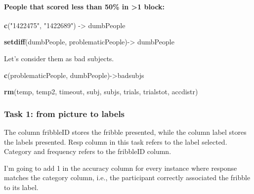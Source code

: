 \documentclass[
]{article}
\newenvironment{Shaded}{\begin{snugshade}}{\end{snugshade}}
\newcommand{\KeywordTok}[1]{\textcolor[rgb]{0.13,0.29,0.53}{\textbf{#1}}}
\newcommand{\NormalTok}[1]{#1}
\newcommand{\StringTok}[1]{\textcolor[rgb]{0.31,0.60,0.02}{#1}}
\begin{document}
\hypertarget{people-that-scored-less-than-50-in-1-block}{%
\paragraph{People that scored less than 50\% in \textgreater1
block:}\label{people-that-scored-less-than-50-in-1-block}}

\begin{Shaded}
\begin{Highlighting}[]
\KeywordTok{c}\NormalTok{(}\StringTok{"1422475"}\NormalTok{, }\StringTok{"1422689"}\NormalTok{) ->}\StringTok{ }\NormalTok{dumbPeople}
\end{Highlighting}
\end{Shaded}

\begin{Shaded}
\begin{Highlighting}[]
\KeywordTok{setdiff}\NormalTok{(dumbPeople, problematicPeople)->}\StringTok{ }\NormalTok{dumbPeople}
\end{Highlighting}
\end{Shaded}

Let's consider them as bad subjects.

\begin{Shaded}
\begin{Highlighting}[]
\KeywordTok{c}\NormalTok{(problematicPeople, dumbPeople)->badsubjs}
\end{Highlighting}
\end{Shaded}

\begin{Shaded}
\begin{Highlighting}[]
\KeywordTok{rm}\NormalTok{(temp, temp2, timeout, subj, subjs, trials, trialstot, accdistr)}
\end{Highlighting}
\end{Shaded}

\hypertarget{task-1-from-picture-to-labels}{%
\subsubsection{Task 1: from picture to
labels}\label{task-1-from-picture-to-labels}}

The column fribbleID stores the fribble presented, while the column
label stores the labels presented. Resp column in this task refers to
the label selected. Category and frequency refers to the fribbleID
column.

I'm going to add 1 in the accuracy column for every instance where
response matches the category column, i.e., the participant correctly
associated the fribble to its label.
\end{document}
